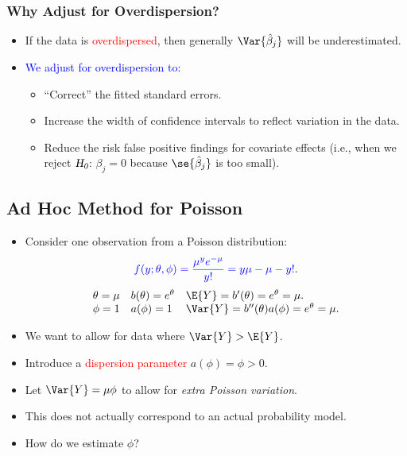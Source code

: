 \documentclass[oneside]{book}\usepackage[]{graphicx}\usepackage[svgnames]{xcolor}
\let\exp\relax%
\let\log\relax%
\newcommand{\HN}{\textsl{H}_{\textsl{0}}}%
\begin{document}
\subsubsection*{Why Adjust for Overdispersion?}
\begin{itemize}
      \item If the data is \textcolor{Red}{overdispersed}, then generally $ \Var{\hat{\beta}_j} $ will be underestimated.
      \item \textcolor{Blue}{We adjust for overdispersion to}:
            \begin{itemize}
                  \item ``Correct'' the fitted standard errors.
                  \item Increase the width of confidence intervals to reflect variation in the data.
                  \item Reduce the risk false positive findings for covariate effects (i.e., when we reject $ \HN $: $ \beta_j=0 $
                        because $ \se{\hat{\beta}_j} $ is too small).
            \end{itemize}
\end{itemize}
\subsection*{Ad Hoc Method for Poisson}
\begin{itemize}
      \item Consider one observation from a Poisson distribution:
            \[ \textcolor{Blue}{f(y;\theta,\phi)=\frac{\mu^y e^{-\mu}}{y!}=\exp{y\log{\mu}-\mu-\log{y!}}}. \]
            \[ \begin{array}{lll}
                        \theta=\log{\mu} & b(\theta)=e^{\theta} & \E{Y}=b^\prime(\theta)=e^{\theta}=\mu.                  \\
                        \phi=1           & a(\phi)=1            & \Var{Y}=b^{\prime\prime}(\theta)a(\phi)=e^{\theta}=\mu.
                  \end{array} \]
      \item We want to allow for data where $ \Var{Y}>\E{Y} $.
      \item Introduce a \textcolor{Red}{dispersion parameter} $ a(\phi)=\phi>0 $.
      \item Let $ \Var{Y}=\mu\phi $ to allow for \emph{extra Poisson variation}.
      \item This does not actually correspond to an actual probability model.
      \item How do we estimate $ \phi $?
\end{itemize}
\end{document}
